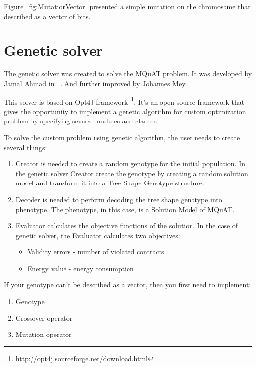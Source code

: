 Figure~\ref{fig:MutationVector} presented a simple mutation on the chromosome that described as a vector of bits.




\section{Genetic solver}\label{sec:GeneticSolver}
The genetic solver was created to solve the MQuAT problem. It was developed by Jamal Ahmad in ~\cite{ahmad18}. And further improved by Johannes Mey.

This solver is based on Opt4J framework~\footnote{http://opt4j.sourceforge.net/download.html}. It's an open-source framework that gives the opportunity to implement a genetic algorithm for custom optimization problem by specifying several modules and classes.

To solve the custom problem using genetic algorithm, the user needs to create several things:

\begin{enumerate}
	\item Creator is needed to create a random genotype for the initial population.
	In the genetic solver Creator create the genotype by creating a random solution model and transform it into a Tree Shape Genotype structure.
	\item Decoder is needed to perform decoding the tree shape genotype into phenotype. The phenotype, in this case, is a Solution Model of MQuAT.
	\item Evaluator calculates the objective functions of the solution. In the case of genetic solver, the Evaluator calculates two objectives: 
	
	\begin{itemize}
		\item Validity errors - number of violated contracts
		\item Energy value - energy consumption
	\end{itemize}
	
\end{enumerate}

If your genotype can't be described as a vector, then you first need to implement:

\begin{enumerate}
	\item Genotype
	\item Crossover operator
	\item Mutation operator
\end{enumerate}

